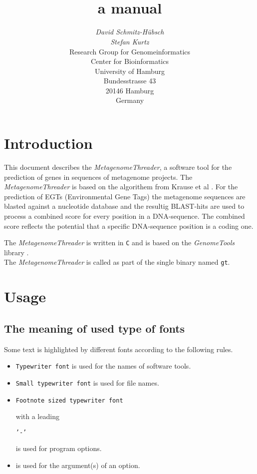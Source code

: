 \documentclass[12pt,titlepage]{article}
\title{\MetagenomeThreader\\
a manual}
\author{\begin{tabular}{c}
         \textit{David Schmitz-H\"{u}bsch}\\
         \textit{Stefan Kurtz}\\[1cm]
         Research Group for Genomeinformatics\\
         Center for Bioinformatics\\
         University of Hamburg\\
         Bundesstrasse 43\\
         20146 Hamburg\\
         Germany\\[1cm]
        \end{tabular}}
\newcommand{\MetagenomeThreader}{\textit{MetagenomeThreader}\xspace}
\newcommand{\GenomeTools}{\textit{GenomeTools}\xspace}
\newcommand{\Gt}{\texttt{gt}\xspace}
\begin{document}
\maketitle



\section{Introduction} \label{Introduction}

This document describes the \MetagenomeThreader, a software tool
for the prediction of genes in sequences of metagenome projects.
The \MetagenomeThreader is based on the algorithem from Krause et al \cite{krause}.
For the prediction of EGTs (Environmental Gene Tags) the metagenome sequences are
blasted against a nucleotide database and the resultig BLAST-hits are used to
process a combined score for every position in a DNA-sequence. The combined score
reflects the potential that a specific DNA-sequence position is a coding one.

The \MetagenomeThreader is written in \texttt{C} and is based 
on the \GenomeTools library \cite{genometools}.
\\
The \MetagenomeThreader is called as part of the single binary named \Gt. 

\section{Usage} \label{Usage}

\subsection{The meaning of used type of fonts} \label{Fonts}
Some text is highlighted by different fonts according to the following rules.

\begin{itemize}
\item \texttt{Typewriter font} is used for the names of software tools.
\item \texttt{\small{Small typewriter font}} is used for file names.
\item \begin{footnotesize}\texttt{Footnote sized typewriter font}
      \end{footnotesize} with a leading 
      \begin{footnotesize}\texttt{'-'}\end{footnotesize} 
      is used for program options.
\item {} is used for the argument(s) of an
      option.
\end{itemize}
\end{document}
